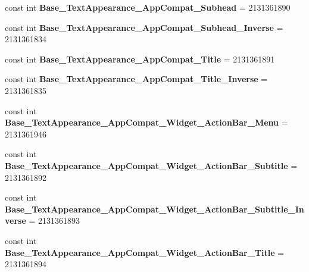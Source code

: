 \begin{DoxyCompactItemize}
const int {\bfseries Base\+\_\+\+Text\+Appearance\+\_\+\+App\+Compat\+\_\+\+Subhead} = 2131361890
\item 
\mbox{\label{class_pinned_app_1_1_droid_1_1_resource_1_1_style_a134660cdf53dc0b1e9acb2e2b791cee8}} 
const int {\bfseries Base\+\_\+\+Text\+Appearance\+\_\+\+App\+Compat\+\_\+\+Subhead\+\_\+\+Inverse} = 2131361834
\item 
\mbox{\label{class_pinned_app_1_1_droid_1_1_resource_1_1_style_a04ded71351e5281bb43bc608f31fe802}} 
const int {\bfseries Base\+\_\+\+Text\+Appearance\+\_\+\+App\+Compat\+\_\+\+Title} = 2131361891
\item 
\mbox{\label{class_pinned_app_1_1_droid_1_1_resource_1_1_style_ae94320732829c23762e69e08cdb60d2c}} 
const int {\bfseries Base\+\_\+\+Text\+Appearance\+\_\+\+App\+Compat\+\_\+\+Title\+\_\+\+Inverse} = 2131361835
\item 
\mbox{\label{class_pinned_app_1_1_droid_1_1_resource_1_1_style_a72e32e22fd34db339d7562b6c868c98d}} 
const int {\bfseries Base\+\_\+\+Text\+Appearance\+\_\+\+App\+Compat\+\_\+\+Widget\+\_\+\+Action\+Bar\+\_\+\+Menu} = 2131361946
\item 
\mbox{\label{class_pinned_app_1_1_droid_1_1_resource_1_1_style_ace670caf9b2b3a7993990265a435dc83}} 
const int {\bfseries Base\+\_\+\+Text\+Appearance\+\_\+\+App\+Compat\+\_\+\+Widget\+\_\+\+Action\+Bar\+\_\+\+Subtitle} = 2131361892
\item 
\mbox{\label{class_pinned_app_1_1_droid_1_1_resource_1_1_style_a0ee9e52c711c65124b5ff798bcf36327}} 
const int {\bfseries Base\+\_\+\+Text\+Appearance\+\_\+\+App\+Compat\+\_\+\+Widget\+\_\+\+Action\+Bar\+\_\+\+Subtitle\+\_\+\+Inverse} = 2131361893
\item 
\mbox{\label{class_pinned_app_1_1_droid_1_1_resource_1_1_style_ad84db7eda8fc05f3528a03c61acfc242}} 
const int {\bfseries Base\+\_\+\+Text\+Appearance\+\_\+\+App\+Compat\+\_\+\+Widget\+\_\+\+Action\+Bar\+\_\+\+Title} = 2131361894

\end{DoxyCompactItemize}
